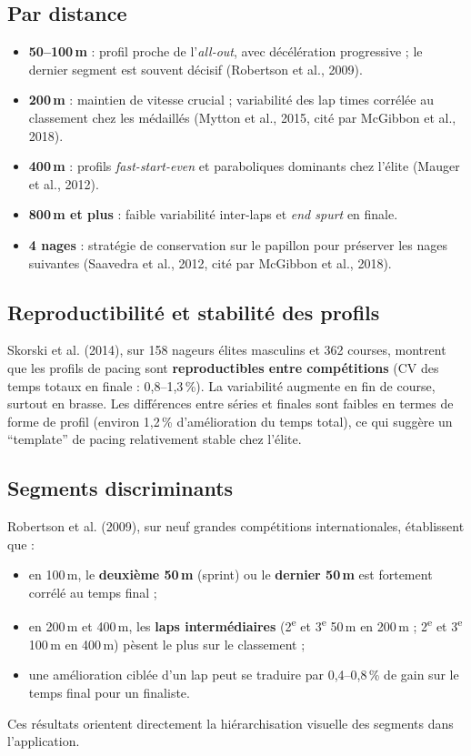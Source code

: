 \documentclass[11pt,a4paper]{article}
\begin{document}
\subsection{Par distance}
\begin{itemize}[leftmargin=*]
    \item \textbf{50--100\,m} : profil proche de l'\textit{all-out}, avec décélération progressive ; le dernier segment est souvent décisif (Robertson et al., 2009).
    \item \textbf{200\,m} : maintien de vitesse crucial ; variabilité des lap times corrélée au classement chez les médaillés (Mytton et al., 2015, cité par McGibbon et al., 2018).
    \item \textbf{400\,m} : profils \textit{fast-start-even} et paraboliques dominants chez l'élite (Mauger et al., 2012).
    \item \textbf{800\,m et plus} : faible variabilité inter-laps et \textit{end spurt} en finale.
    \item \textbf{4 nages} : stratégie de conservation sur le papillon pour préserver les nages suivantes (Saavedra et al., 2012, cité par McGibbon et al., 2018).
\end{itemize}

\subsection{Reproductibilité et stabilité des profils}
Skorski et al. (2014), sur 158 nageurs élites masculins et 362 courses, montrent que les profils de pacing sont \textbf{reproductibles entre compétitions} (CV des temps totaux en finale : 0,8--1,3\,\%). La variabilité augmente en fin de course, surtout en brasse. Les différences entre séries et finales sont faibles en termes de forme de profil (environ 1,2\,\% d'amélioration du temps total), ce qui suggère un ``template'' de pacing relativement stable chez l'élite.

\subsection{Segments discriminants}
Robertson et al. (2009), sur neuf grandes compétitions internationales, établissent que :
\begin{itemize}[leftmargin=*]
    \item en 100\,m, le \textbf{deuxième 50\,m} (sprint) ou le \textbf{dernier 50\,m} est fortement corrélé au temps final ;
    \item en 200\,m et 400\,m, les \textbf{laps intermédiaires} (2\textsuperscript{e} et 3\textsuperscript{e} 50\,m en 200\,m ; 2\textsuperscript{e} et 3\textsuperscript{e} 100\,m en 400\,m) pèsent le plus sur le classement ;
    \item une amélioration ciblée d'un lap peut se traduire par 0,4--0,8\,\% de gain sur le temps final pour un finaliste.
\end{itemize}
Ces résultats orientent directement la hiérarchisation visuelle des segments dans l'application.
\end{document}
